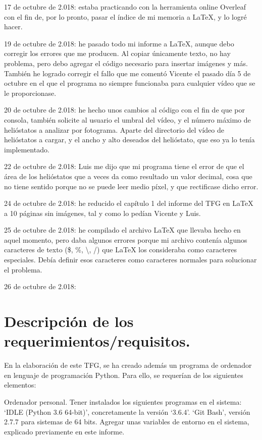 \documentclass[12pt]{article}
\begin{document}
17 de octubre de 2.018: estaba practicando con la herramienta online Overleaf con el fin de, por lo pronto, pasar el índice de mi memoria a LaTeX, y lo logré hacer.

19 de octubre de 2.018: he pasado todo mi informe a LaTeX, aunque debo corregir los errores que me producen. Al copiar únicamente texto, no hay problema, pero debo agregar el código necesario para insertar imágenes y más. También he logrado corregir el fallo que me comentó Vicente el pasado día 5 de octubre en el que el programa no siempre funcionaba para cualquier vídeo que se le proporcionase.

20 de octubre de 2.018: he hecho unos cambios al código con el fin de que por consola, también solicite al usuario el umbral del vídeo, y el número máximo de helióstatos a analizar por fotograma. Aparte del directorio del vídeo de helióstatos a cargar, y el ancho y alto deseados del helióstato, que eso ya lo tenía implementado.

22 de octubre de 2.018: Luis me dijo que mi programa tiene el error de que el área de los helióstatos que a veces da como resultado un valor decimal, cosa que no tiene sentido porque no se puede leer medio píxel, y que rectificase dicho error.

24 de octubre de 2.018: he reducido el capítulo 1 del informe del TFG en LaTeX a 10 páginas sin imágenes, tal y como lo pedían Vicente y Luis.

25 de octubre de 2.018: he compilado el archivo LaTeX que llevaba hecho en aquel momento, pero daba algunos errores porque mi archivo contenía algunos caracteres de texto (\$, \%, \textbackslash, /) que LaTeX los consideraba como caracteres especiales. Debía definir esos caracteres como caracteres normales para solucionar el problema.

26 de octubre de 2.018: 

\section{Descripción de los requerimientos/requisitos.}

En la elaboración de este TFG, se ha creado además un programa de ordenador en lenguaje de programación Python. Para ello, se requerían de los siguientes elementos:

Ordenador personal.
Tener instalados los siguientes programas en el sistema:
‘IDLE (Python 3.6 64-bit)’, concretamente la versión ‘3.6.4’.
‘Git Bash’, versión 2.7.7 para sistemas de 64 bits.
Agregar unas variables de entorno en el sistema, explicado previamente en este informe.
\end{document}
